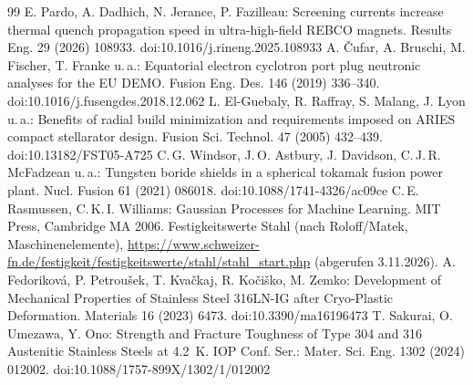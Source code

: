 \documentclass[10pt,a4paper]{article}
\begin{document}
\begin{thebibliography}{99}
 E. Pardo, A. Dadhich, N. Jerance, P. Fazilleau: Screening currents increase thermal quench propagation speed in ultra-high-field REBCO magnets. Results Eng. 29 (2026) 108933. doi:10.1016/j.rineng.2025.108933
 A. Čufar, A. Bruschi, M. Fischer, T. Franke u.\,a.: Equatorial electron cyclotron port plug neutronic analyses for the EU DEMO. Fusion Eng. Des. 146 (2019) 336--340. doi:10.1016/j.fusengdes.2018.12.062
 L. El-Guebaly, R. Raffray, S. Malang, J. Lyon u.\,a.: Benefits of radial build minimization and requirements imposed on ARIES compact stellarator design. Fusion Sci. Technol. 47 (2005) 432--439. doi:10.13182/FST05-A725
 C.\,G. Windsor, J.\,O. Astbury, J. Davidson, C.\,J.\,R. McFadzean u.\,a.: Tungsten boride shields in a spherical tokamak fusion power plant. Nucl. Fusion 61 (2021) 086018. doi:10.1088/1741-4326/ac09ce
 C.\,E. Rasmussen, C.\,K.\,I. Williams: Gaussian Processes for Machine Learning. MIT Press, Cambridge MA 2006.
 Festigkeitswerte Stahl (nach Roloff/Matek, Maschinenelemente), \url{https://www.schweizer-fn.de/festigkeit/festigkeitswerte/stahl/stahl_start.php} (abgerufen 3.11.2026).
 A. Fedoriková, P. Petroušek, T. Kvačkaj, R. Kočiško, M. Zemko: Development of Mechanical Properties of Stainless Steel 316LN-IG after Cryo-Plastic Deformation. Materials 16 (2023) 6473. doi:10.3390/ma16196473
 T. Sakurai, O. Umezawa, Y. Ono: Strength and Fracture Toughness of Type 304 and 316 Austenitic Stainless Steels at 4.2~K. IOP Conf. Ser.: Mater. Sci. Eng. 1302 (2024) 012002. doi:10.1088/1757-899X/1302/1/012002
\end{thebibliography}
\end{document}
